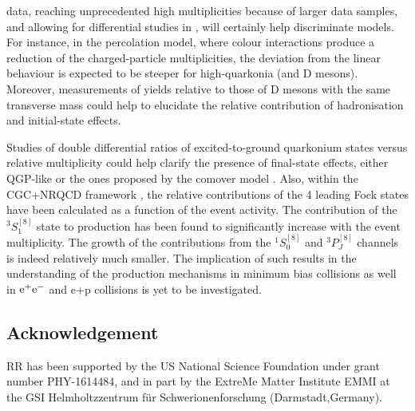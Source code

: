 \documentclass[../report.tex]{subfiles}
\begin{document}
\RunsThreeFour data, reaching unprecedented high multiplicities because of larger data samples, and allowing for differential studies in \pT, will certainly help discriminate models.
For instance, in the percolation model, where colour interactions produce a reduction of the charged-particle multiplicities, the deviation from the linear behaviour is expected to be steeper for high-\pT quarkonia (and D mesons).
Moreover, measurements of \PJgy  yields relative to those of D mesons with the same transverse mass could help to elucidate the relative contribution of hadronisation and initial-state effects.

Studies of double differential ratios of excited-to-ground quarkonium states versus relative multiplicity could help clarify the presence of final-state effects, either QGP-like or the ones proposed by the comover model \cite{Ferreiro:2014bia,Ferreiro:2018wbd}.
Also, within the CGC+NRQCD framework \cite{Ma:2018bax}, the relative contributions of the 4 leading \PJgy Fock states have been calculated as a function of the event activity.
The contribution of the $^3S_1^{[8]}$ state to \PJgy production has been found to significantly increase with the event multiplicity. The growth of the contributions from the $^1S_0^{[8]}$  and $^3P_J^{[8]}$ channels is indeed relatively much smaller. The implication of such results in the understanding of the production mechanisms in minimum bias \pp collisions as well in  ${\rm e}^+{\rm e}^-$ and e+p collisions is yet to be investigated. 


\subsection*{Acknowledgement}
RR has been supported by the US National Science Foundation under
grant number PHY-1614484, and in part by the ExtreMe Matter Institute EMMI at 
the GSI Helmholtzzentrum f\"{u}r Schwerionenforschung (Darmstadt,Germany).
\end{document}
